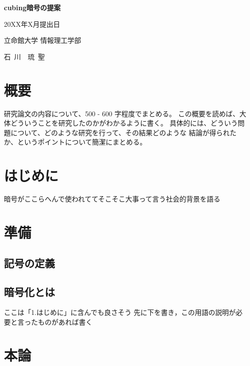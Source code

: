 \documentclass{jsarticle}
\begin{document}
\thispagestyle{empty}
\begin{center}
\vspace*{4.5cm}
{\huge\bf cubing暗号の提案}
\vspace*{3cm}

{\large 20XX年X月提出日}
\vspace*{3cm}

{\large 立命館大学 情報理工学部}
\vspace*{5mm}

{\Large 石~川~~琉~聖}
\end{center}
\newpage 

\setcounter{page}{1}

\section*{概要}

研究論文の内容について、500 - 600 字程度でまとめる。
この概要を読めば、大体どういうことを研究したのかがわかるように書く。
具体的には、どういう問題について、どのような研究を行って、その結果どのような
結論が得られたか、というポイントについて簡潔にまとめる。

\newpage

\tableofcontents
\clearpage

\section{はじめに}
暗号がここらへんで使われててそこそこ大事って言う社会的背景を語る

\section{準備}
\subsection{記号の定義}
\subsection{暗号化とは}
ここは「1.はじめに」に含んでも良さそう
先に下を書き，この用語の説明が必要と言ったものがあれば書く

\section{本論}
\end{document}

